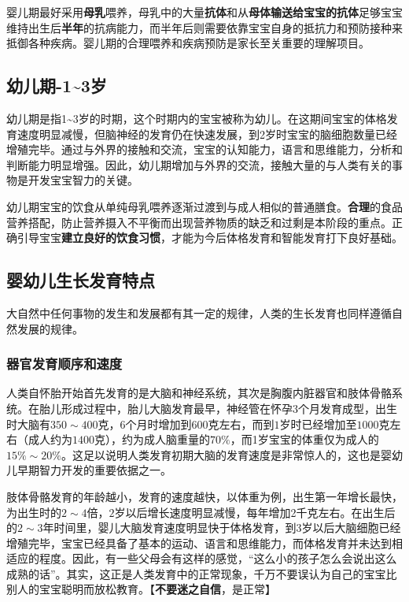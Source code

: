 婴儿期最好采用\textbf{母乳}喂养，母乳中的大量\textbf{抗体}和从\textbf{母体输送给宝宝的抗体}足够宝宝维持出生后\textbf{半年}的抗病能力，而半年后则需要依靠宝宝自身的抵抗力和预防接种来抵御各种疾病。婴儿期的合理喂养和疾病预防是家长至关重要的理解项目。

\subsection[幼儿期]{幼儿期-\small 1\textasciitilde3岁}

幼儿期是指1\textasciitilde3岁的时期，这个时期内的宝宝被称为幼儿。在这期间宝宝的体格发育速度明显减慢，但脑神经的发育仍在快速发展，到2岁时宝宝的脑细胞数量已经增殖完毕。通过与外界的接触和交流，宝宝的认知能力，语言和思维能力，分析和判断能力明显增强。因此，幼儿期增加与外界的交流，接触大量的与人类有关的事物是开发宝宝智力的关键。

幼儿期宝宝的饮食从单纯母乳喂养逐渐过渡到与成人相似的普通膳食。\textbf{合理}的食品营养搭配，防止营养摄入不平衡而出现营养物质的缺乏和过剩是本阶段的重点。正确引导宝宝\textbf{建立良好的饮食习惯}，才能为今后体格发育和智能发育打下良好基础。

\subsection{婴幼儿生长发育特点}

大自然中任何事物的发生和发展都有其一定的规律，人类的生长发育也同样遵循自然发展的规律。

\subsubsection{器官发育顺序和速度}

人类自怀胎开始首先发育的是大脑和神经系统，其次是胸腹内脏器官和肢体骨骼系统。在胎儿形成过程中，胎儿大脑发育最早，神经管在怀孕3个月发育成型，出生时大脑有$350\sim{}400$克，$6$个月时增加到$600$克左右，而到$1$岁时已经增加至$1000$克左右（成人约为$1400$克），约为成人脑重量的$70\%$，而1岁宝宝的体重仅为成人的$15\%\sim{}20\%$。这足以说明人类发育初期大脑的发育速度是非常惊人的，这也是婴幼儿早期智力开发的重要依据之一。

肢体骨骼发育的年龄越小，发育的速度越快，以体重为例，出生第一年增长最快，为出生时的$2\sim{}4$倍，$2$岁以后增长速度明显减慢，每年增加2千克左右。在出生后的$2\sim{}3$年时间里，婴儿大脑发育速度明显快于体格发育，到3岁以后大脑细胞已经增殖完毕，宝宝已经具备了基本的运动、语言和思维能力，而体格发育并未达到相适应的程度。因此，有一些父母会有这样的感觉，``这么小的孩子怎么会说出这么成熟的话''。其实，这正是人类发育中的正常现象，千万不要误认为自己的宝宝比别人的宝宝聪明而放松教育。【\textbf{不要迷之自信}，是正常】

